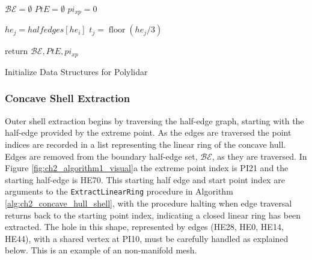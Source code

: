 \begin{algorithm}[ht]

    
    $\mathcal{BE} = \emptyset$ 
    $PtE = \emptyset$ 
    $pi_{xp} = 0$ 
     { 
         { 
            $he_j = halfedges[he_i]$
            $t_j = \operatorname{floor}(he_j / 3)$ 
        }
  
    }
    return $\mathcal{BE}, PtE, pi_{xp}$
    \caption{Initialize Data Structures for Polylidar}\label{alg:ch2_boundary_edges}
\end{algorithm}


\subsubsection{Concave Shell Extraction}
Outer shell extraction begins by traversing the half-edge graph, starting with the half-edge provided by the extreme point. As the edges are traversed the point indices are recorded in a list representing the linear ring of the concave hull. Edges are removed from the boundary half-edge set, $\mathcal{BE}$, as they are traversed.  In Figure \ref{fig:ch2_algorithm1_visual}a the extreme point index is PI21 and the starting half-edge is HE70. This starting half edge and start point index are arguments to the \texttt{ExtractLinearRing} procedure in Algorithm \ref{alg:ch2_concave_hull_shell}, with the procedure halting when edge traversal returns back to the starting point index, indicating a closed linear ring has been extracted. The hole in this shape, represented by edges (HE28, HE0, HE14, HE44), with a shared vertex at PI10, must be carefully handled as explained below. This is an example of an non-manifold mesh.

